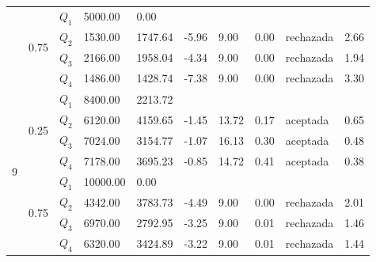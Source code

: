 \begin{table}[]
\begin{tabular}{|l|l|l|l|l|l|l|l|l|l|}
 & \multirow{4}{*}{0.75} & $Q_1$ & 5000.00 & 0.00 & \multicolumn{5}{l|}{} \\ \cline{3-10} 
 &  & $Q_2$ & 1530.00 & 1747.64 & -5.96 & 9.00 & 0.00 & rechazada & 2.66 \\ \cline{3-10} 
 &  & $Q_3$ & 2166.00 & 1958.04 & -4.34 & 9.00 & 0.00 & rechazada & 1.94 \\ \cline{3-10} 
 &  & $Q_4$ & 1486.00 & 1428.74 & -7.38 & 9.00 & 0.00 & rechazada & 3.30 \\ \hline
\multirow{8}{*}{9} & \multirow{4}{*}{0.25} & $Q_1$ & 8400.00 & 2213.72 & \multicolumn{5}{l|}{} \\ \cline{3-10} 
 &  & $Q_2$ & 6120.00 & 4159.65 & -1.45 & 13.72 & 0.17 & aceptada & 0.65 \\ \cline{3-10} 
 &  & $Q_3$ & 7024.00 & 3154.77 & -1.07 & 16.13 & 0.30 & aceptada & 0.48 \\ \cline{3-10} 
 &  & $Q_4$ & 7178.00 & 3695.23 & -0.85 & 14.72 & 0.41 & aceptada & 0.38 \\ \cline{2-10} 
 & \multirow{4}{*}{0.75} & $Q_1$ & 10000.00 & 0.00 & \multicolumn{5}{l|}{} \\ \cline{3-10} 
 &  & $Q_2$ & 4342.00 & 3783.73 & -4.49 & 9.00 & 0.00 & rechazada & 2.01 \\ \cline{3-10} 
 &  & $Q_3$ & 6970.00 & 2792.95 & -3.25 & 9.00 & 0.01 & rechazada & 1.46 \\ \cline{3-10} 
 &  & $Q_4$ & 6320.00 & 3424.89 & -3.22 & 9.00 & 0.01 & rechazada & 1.44 \\ \hline
\end{tabular}
\end{table}


